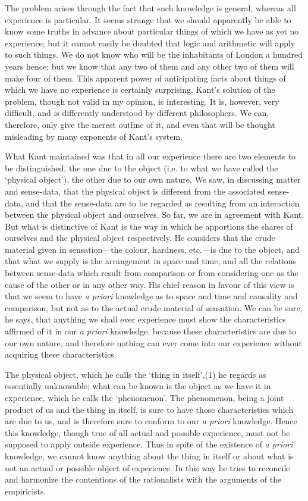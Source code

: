 \documentclass[oneside,letterpaper,12pt]{book}
\begin{document}
The problem arises through the fact that such knowledge is general,
whereas all experience is particular. It seems strange that we should
apparently be able to know some truths in advance about particular
things of which we have as yet no experience; but it cannot easily be
doubted that logic and arithmetic will apply to such things. We do not
know who will be the inhabitants of London a hundred years hence; but we
know that any two of them and any other two of them will make four of
them. This apparent power of anticipating facts about things of which we
have no experience is certainly surprising. Kant's
solution of the problem, though not valid in my opinion, is interesting.
It is, however, very difficult, and is differently understood by
different philosophers. We can, therefore, only give the merest outline
of it, and even that will be thought misleading by many exponents of
Kant's system.

\label{Kant} What Kant maintained was that in all our experience there are two
elements to be distinguished, the one due to the object (i.e. to what we
have called the `physical object'), the
other due to our own nature. We saw, in discussing matter and
sense-data, that the physical object is different from the associated
sense-data, and that the sense-data are to be regarded as resulting from
an interaction between the physical object and ourselves. So far, we are
in agreement with Kant. But what is distinctive of Kant is the way in
which he apportions the shares of ourselves and the physical object
respectively. He considers that the crude material given in
sensation---the colour, hardness, etc.---is due to the object, and that
what we supply is the arrangement in space and time, and all the
relations between sense-data which result from comparison or from
considering one as the cause of the other or in any other way. His chief
reason in favour of this view is that we seem to have \emph{a priori}
knowledge as to space and time and causality and comparison, but not as
to the actual crude material of sensation. We can be sure, he says, that
anything we shall ever experience must show the characteristics affirmed
of it in our \emph{a priori} knowledge, because these characteristics
are due to our own nature, and therefore nothing can ever come into our
experience without acquiring these characteristics.

The physical object, which he calls the `thing in
itself',(1) he regards as essentially unknowable; what
can be known is the object as we have it in experience, which he calls
the `phenomenon'. The phenomenon, being a
joint product of us and the thing in itself, is sure to have those
characteristics which are due to us, and is therefore sure to conform to
our \emph{a priori} knowledge. Hence this knowledge, though true of all
actual and possible experience, must not be supposed to apply outside
experience. Thus in spite of the existence of \emph{a priori} knowledge,
we cannot know anything about the thing in itself or about what is not
an actual or possible object of experience. In this way he tries to
reconcile and harmonize the contentions of the rationalists with the
arguments of the empiricists.
\end{document}
